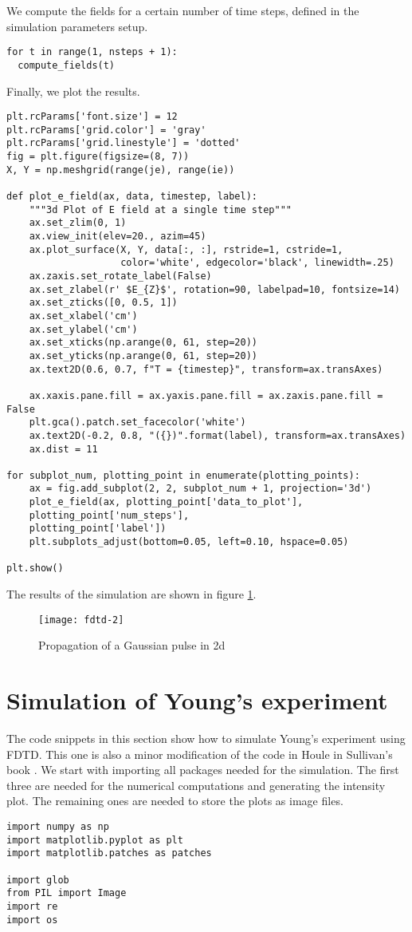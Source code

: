 \documentclass[11pt]{article}
\numberwithin{equation}{section}
\begin{document}
We compute the fields for a certain number of time steps, defined in the
simulation parameters setup.
\begin{verbatim}
for t in range(1, nsteps + 1):
  compute_fields(t)
\end{verbatim}

Finally, we plot the results.
\begin{verbatim}
plt.rcParams['font.size'] = 12
plt.rcParams['grid.color'] = 'gray'
plt.rcParams['grid.linestyle'] = 'dotted'
fig = plt.figure(figsize=(8, 7))
X, Y = np.meshgrid(range(je), range(ie))

def plot_e_field(ax, data, timestep, label):
    """3d Plot of E field at a single time step"""
    ax.set_zlim(0, 1)
    ax.view_init(elev=20., azim=45)
    ax.plot_surface(X, Y, data[:, :], rstride=1, cstride=1, 
                    color='white', edgecolor='black', linewidth=.25)
    ax.zaxis.set_rotate_label(False)
    ax.set_zlabel(r' $E_{Z}$', rotation=90, labelpad=10, fontsize=14)
    ax.set_zticks([0, 0.5, 1])
    ax.set_xlabel('cm')
    ax.set_ylabel('cm')
    ax.set_xticks(np.arange(0, 61, step=20))
    ax.set_yticks(np.arange(0, 61, step=20))
    ax.text2D(0.6, 0.7, f"T = {timestep}", transform=ax.transAxes)

    ax.xaxis.pane.fill = ax.yaxis.pane.fill = ax.zaxis.pane.fill = False
    plt.gca().patch.set_facecolor('white')
    ax.text2D(-0.2, 0.8, "({})".format(label), transform=ax.transAxes)
    ax.dist = 11

for subplot_num, plotting_point in enumerate(plotting_points):
    ax = fig.add_subplot(2, 2, subplot_num + 1, projection='3d')
    plot_e_field(ax, plotting_point['data_to_plot'],
    plotting_point['num_steps'],
    plotting_point['label'])
    plt.subplots_adjust(bottom=0.05, left=0.10, hspace=0.05)

plt.show()
\end{verbatim}
The results of the simulation are shown in figure \ref{f3}.
\begin{figure}
\centering
\texttt{[image: fdtd-2]}
\caption{Propagation of a Gaussian pulse in 2d}\label{f3}
\end{figure}

\section{Simulation of Young's experiment}\label{s9}
The code snippets in this section show how to simulate Young's experiment
using FDTD. This one is also a minor modification of the code in Houle in 
Sullivan's book \cite{sullivan2013electromagnetic}. We start with importing
all packages needed for the simulation. The first three are needed for the
numerical computations and generating the intensity plot. The remaining ones
are needed to store the plots as image files.
\begin{verbatim}
import numpy as np
import matplotlib.pyplot as plt
import matplotlib.patches as patches

import glob
from PIL import Image
import re
import os
\end{verbatim}
\end{document}
